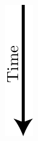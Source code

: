 \begin{figure}[htbp]
  \centering
   \begin{subfigure}[b]{.03\linewidth}
    \centering
    \includegraphics[width=\linewidth]{figures/arrow.pdf}

\end{subfigure}
\end{figure}
